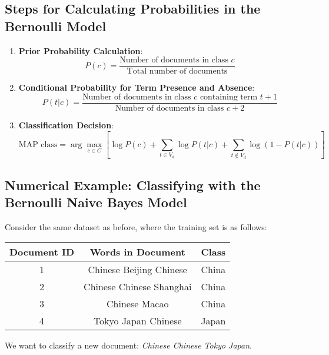 \documentclass{article}
\begin{document}
\subsection*{Steps for Calculating Probabilities in the Bernoulli Model}
\begin{enumerate}
    \item \textbf{Prior Probability Calculation}:
    \[
    P(c) = \frac{\text{Number of documents in class } c}{\text{Total number of documents}}
    \]

    \item \textbf{Conditional Probability for Term Presence and Absence}:
    \[
    P(t|c) = \frac{\text{Number of documents in class } c \text{ containing term } t + 1}{\text{Number of documents in class } c + 2}
    \]

    \item \textbf{Classification Decision}:
    \[
    \text{MAP class} = \arg \max_{c \in C} \left[ \log P(c) + \sum_{t \in V_d} \log P(t|c) + \sum_{t \notin V_d} \log(1 - P(t|c)) \right]
    \]
\end{enumerate}

\subsection*{Numerical Example: Classifying with the Bernoulli Naive Bayes Model}
Consider the same dataset as before, where the training set is as follows:

\begin{table}[h!]
    \centering
    \begin{tabular}{|c|c|c|}
    \hline
    Document ID & Words in Document & Class \\
    \hline
    1 & Chinese Beijing Chinese & China \\
    2 & Chinese Chinese Shanghai & China \\
    3 & Chinese Macao & China \\
    4 & Tokyo Japan Chinese & Japan \\
    \hline
    \end{tabular}
\end{table}

We want to classify a new document: \textit{Chinese Chinese Tokyo Japan}.
\end{document}
